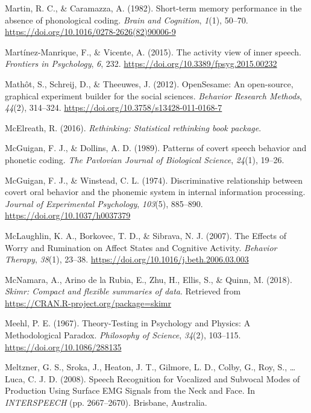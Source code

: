 \documentclass[a4paper,12pt,twoside,openright,oldfontcommands]{memoir}
\begin{document}
\leavevmode\hypertarget{ref-martin_short-term_1982}{}%
Martin, R. C., \& Caramazza, A. (1982). Short-term memory performance in the absence of phonological coding. \emph{Brain and Cognition}, \emph{1}(1), 50--70. \url{https://doi.org/10.1016/0278-2626(82)90006-9}

\leavevmode\hypertarget{ref-Martinez-Manrique2015}{}%
Martínez-Manrique, F., \& Vicente, A. (2015). The activity view of inner speech. \emph{Frontiers in Psychology}, \emph{6}, 232. \url{https://doi.org/10.3389/fpsyg.2015.00232}

\leavevmode\hypertarget{ref-mathot_opensesame:_2012}{}%
Mathôt, S., Schreij, D., \& Theeuwes, J. (2012). OpenSesame: An open-source, graphical experiment builder for the social sciences. \emph{Behavior Research Methods}, \emph{44}(2), 314--324. \url{https://doi.org/10.3758/s13428-011-0168-7}

\leavevmode\hypertarget{ref-R-rethinking}{}%
McElreath, R. (2016). \emph{Rethinking: Statistical rethinking book package}.

\leavevmode\hypertarget{ref-mcguigan_patterns_1989}{}%
McGuigan, F. J., \& Dollins, A. D. (1989). Patterns of covert speech behavior and phonetic coding. \emph{The Pavlovian Journal of Biological Science}, \emph{24}(1), 19--26.

\leavevmode\hypertarget{ref-mcguigan_discriminative_1974}{}%
McGuigan, F. J., \& Winstead, C. L. (1974). Discriminative relationship between covert oral behavior and the phonemic system in internal information processing. \emph{Journal of Experimental Psychology}, \emph{103}(5), 885--890. \url{https://doi.org/10.1037/h0037379}

\leavevmode\hypertarget{ref-mclaughlin_effects_2007}{}%
McLaughlin, K. A., Borkovec, T. D., \& Sibrava, N. J. (2007). The Effects of Worry and Rumination on Affect States and Cognitive Activity. \emph{Behavior Therapy}, \emph{38}(1), 23--38. \url{https://doi.org/10.1016/j.beth.2006.03.003}

\leavevmode\hypertarget{ref-R-skimr}{}%
McNamara, A., Arino de la Rubia, E., Zhu, H., Ellis, S., \& Quinn, M. (2018). \emph{Skimr: Compact and flexible summaries of data}. Retrieved from \url{https://CRAN.R-project.org/package=skimr}

\leavevmode\hypertarget{ref-meehl_theory-testing_1967}{}%
Meehl, P. E. (1967). Theory-Testing in Psychology and Physics: A Methodological Paradox. \emph{Philosophy of Science}, \emph{34}(2), 103--115. \url{https://doi.org/10.1086/288135}

\leavevmode\hypertarget{ref-meltzner_speech_2008}{}%
Meltzner, G. S., Sroka, J., Heaton, J. T., Gilmore, L. D., Colby, G., Roy, S., \ldots{} Luca, C. J. D. (2008). Speech Recognition for Vocalized and Subvocal Modes of Production Using Surface EMG Signals from the Neck and Face. In \emph{INTERSPEECH} (pp. 2667--2670). Brisbane, Australia.
\end{document}
